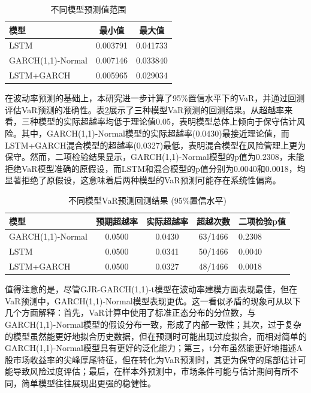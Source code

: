 \documentclass[12pt, a4paper]{article}
\begin{document}
\begin{table}[htbp]
\centering
\caption{不同模型预测值范围}
\label{tab:pred_range}
\begin{tabular}{lcc}
\toprule
模型 & 最小值 & 最大值 \\
\midrule
LSTM & 0.003791 & 0.041733 \\
GARCH(1,1)-Normal & 0.007146 & 0.033840 \\
LSTM+GARCH & 0.005965 & 0.029034 \\
\bottomrule
\end{tabular}
\end{table}

在波动率预测的基础上，本研究进一步计算了95\%置信水平下的VaR，并通过回测评估VaR预测的准确性。表\ref{tab:var_results}展示了三种模型VaR预测的回测结果。从超越率来看，三种模型的实际超越率均低于理论值0.05，表明模型总体上倾向于保守估计风险。其中，GARCH(1,1)-Normal模型的实际超越率(0.0430)最接近理论值，而LSTM+GARCH混合模型的超越率(0.0327)最低，表明混合模型在风险管理上更为保守。然而，二项检验结果显示，GARCH(1,1)-Normal模型的p值为0.2308，未能拒绝VaR模型准确的原假设，而LSTM和混合模型的p值分别为0.0040和0.0018，均显著拒绝了原假设，这意味着后两种模型的VaR预测可能存在系统性偏离。

\begin{table}[htbp]
\centering
\caption{不同模型VaR预测回测结果 (95\%置信水平)}
\label{tab:var_results}
\begin{tabular}{lcccl}
\toprule
模型 & 预期超越率 & 实际超越率 & 超越次数 & 二项检验p值 \\
\midrule
GARCH(1,1)-Normal & 0.0500 & 0.0430 & 63/1466 & 0.2308 \\
LSTM & 0.0500 & 0.0341 & 50/1466 & 0.0040 \\
LSTM+GARCH & 0.0500 & 0.0327 & 48/1466 & 0.0018 \\
\bottomrule
\end{tabular}
\end{table}

值得注意的是，尽管GJR-GARCH(1,1)-t模型在波动率建模方面表现最佳，但在VaR预测中，GARCH(1,1)-Normal模型表现更优。这一看似矛盾的现象可从以下几个方面解释：首先，VaR计算中使用了标准正态分布的分位数，与GARCH(1,1)-Normal模型的假设分布一致，形成了内部一致性；其次，过于复杂的模型虽然能更好地拟合历史数据，但在预测时可能出现过度拟合，而相对简单的GARCH(1,1)-Normal模型具有更好的泛化能力；第三，t分布虽然能更好地描述A股市场收益率的尖峰厚尾特征，但在转化为VaR预测时，其更为保守的尾部估计可能导致风险过度评估；最后，在样本外预测中，市场条件可能与估计期间有所不同，简单模型往往展现出更强的稳健性。
\end{document}
